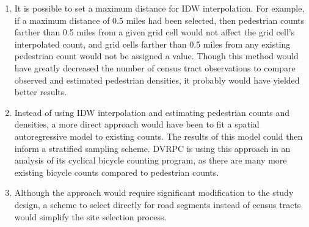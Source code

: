 \documentclass[paper=letterpaper, fontsize=11pt]{scrartcl}
\begin{document}
\begin{enumerate}
	\item It is possible to set a maximum distance for IDW interpolation. For example, if a maximum distance of 0.5 miles had been selected, then pedestrian counts farther than 0.5 miles from a given grid cell would not affect the grid cell's interpolated count, and grid cells farther than 0.5 miles from any existing pedestrian count would not be assigned a value. Though this method would have greatly decreased the number of census tract observations to compare observed and estimated pedestrian densities, it probably would have yielded better results.
	\item Instead of using IDW interpolation and estimating pedestrian counts and densities, a more direct approach would have been to fit a spatial autoregressive model to existing counts. The results of this model could then inform a stratified sampling scheme. DVRPC is using this approach in an analysis of its cyclical bicycle counting program, as there are many more existing bicycle counts compared to pedestrian counts.
	\item Although the approach would require significant modification to the study design, a scheme to select directly for road segments instead of census tracts would simplify the site selection process.
\end{enumerate}



\end{document}
